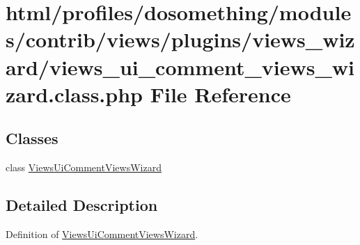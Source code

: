\hypertarget{views__ui__comment__views__wizard_8class_8php}{
\section{html/profiles/dosomething/modules/contrib/views/plugins/views\_\-wizard/views\_\-ui\_\-comment\_\-views\_\-wizard.class.php File Reference}
\label{views__ui__comment__views__wizard_8class_8php}
}
\subsection*{Classes}
\begin{DoxyCompactItemize}
\item 
class \hyperlink{classViewsUiCommentViewsWizard}{ViewsUiCommentViewsWizard}
\end{DoxyCompactItemize}


\subsection{Detailed Description}
Definition of \hyperlink{classViewsUiCommentViewsWizard}{ViewsUiCommentViewsWizard}. 